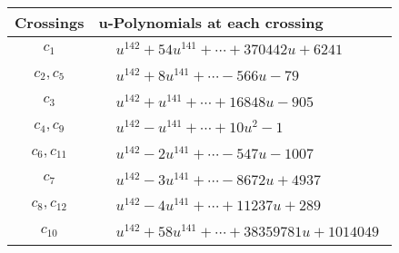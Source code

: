 \documentclass[1p]{elsarticle_modified}
\theoremstyle{definition}
\begin{document}
\begin{tabular}{m{50pt}|m{274pt}}
Crossings & \hspace{64pt}u-Polynomials at each crossing \\
\hline $$\begin{aligned}c_{1}\end{aligned}$$&$\begin{aligned}
&u^{142}+54 u^{141}+\cdots+370442 u+6241
\end{aligned}$\\
\hline $$\begin{aligned}c_{2},c_{5}\end{aligned}$$&$\begin{aligned}
&u^{142}+8 u^{141}+\cdots-566 u-79
\end{aligned}$\\
\hline $$\begin{aligned}c_{3}\end{aligned}$$&$\begin{aligned}
&u^{142}+u^{141}+\cdots+16848 u-905
\end{aligned}$\\
\hline $$\begin{aligned}c_{4},c_{9}\end{aligned}$$&$\begin{aligned}
&u^{142}- u^{141}+\cdots+10 u^2-1
\end{aligned}$\\
\hline $$\begin{aligned}c_{6},c_{11}\end{aligned}$$&$\begin{aligned}
&u^{142}-2 u^{141}+\cdots-547 u-1007
\end{aligned}$\\
\hline $$\begin{aligned}c_{7}\end{aligned}$$&$\begin{aligned}
&u^{142}-3 u^{141}+\cdots-8672 u+4937
\end{aligned}$\\
\hline $$\begin{aligned}c_{8},c_{12}\end{aligned}$$&$\begin{aligned}
&u^{142}-4 u^{141}+\cdots+11237 u+289
\end{aligned}$\\
\hline $$\begin{aligned}c_{10}\end{aligned}$$&$\begin{aligned}
&u^{142}+58 u^{141}+\cdots+38359781 u+1014049
\end{aligned}$\\
\hline
\end{tabular}\\~\\
\end{document}
